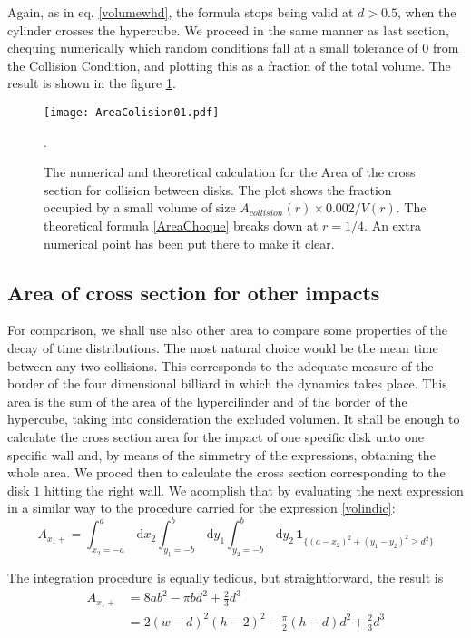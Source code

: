 \documentclass[a4paper,10pt, jcp, aps, preprint]{revtex4-1}
\newcommand{\rd}{\, \mathrm{d}}
\newcommand{\indicator}[1]{\mathbf{1}_{ \{   #1 \} } }
\begin{document}
Again, as in eq. \ref{volumewhd}, the formula stops being valid
at $d>0.5$, when the cylinder crosses the hypercube.  
We proceed in the same manner as last section, chequing numerically which
random
conditions fall at a small tolerance of $0$ from the Collision Condition, and
plotting this as a fraction of the total volume. The result is shown in the
figure \ref{AreaChoqueTeoyNum}. 

\begin{figure}
\centering
\texttt{[image: AreaColision01.pdf]}
\caption{The numerical and theoretical calculation for the Area of the cross section
for collision between disks. The plot shows the fraction occupied by a small volume
of size $A_{collision}(r)\times 0.002/V(r)$. The theoretical formula 
\ref{AreaChoque} breaks down at
$r=1/4$. An extra numerical point has been put there to make it clear.}
\label{AreaChoqueTeoyNum}.
\end{figure}



\subsection{Area of cross section for other impacts}

For comparison, we shall use also other area to compare
some properties of the decay of time distributions. The most natural choice
would be the mean time between any two collisions. This corresponds
to the adequate measure of the border of the four dimensional
billiard in which the dynamics takes place. This area is
the sum of the area of the hypercilinder and of the border of the
hypercube, taking into consideration the excluded volumen. 
It shall be enough to calculate the cross section area for
the impact of one specific disk unto one specific wall and,
by means of the simmetry of the expressions, obtaining the whole
area. We proced then to calculate the cross section corresponding to 
the disk $1$ hitting the right wall. We acomplish that by
evaluating the next expression in a similar way to
the procedure carried for the expression \ref{volindic}:
\begin{equation}\label{areaindic}
 A_{x_1+} =  \int_{x_2 = -a}^a \rd x_2 
\int_{y_1 = -b}^b \rd y_1 \int_{y_2 = -b}^b \rd y_2 \, \indicator{ (a-x_2)^2 + (y_1-y_2)^2 \ge d^2 }
\end{equation}

The integration procedure is equally tedious, but
straightforward, the result is 
\begin{align}\label{areax1p}
 A_{x_1+} & = 8 a b^2-\pi b d^2 +\frac{2}{3}d^3 \\
  & = 2(w-d)^2 (h-2)^2- \frac{\pi}{2} (h-d) d^2 +\frac{2}{3}d^3 
\end{align}
\end{document}
